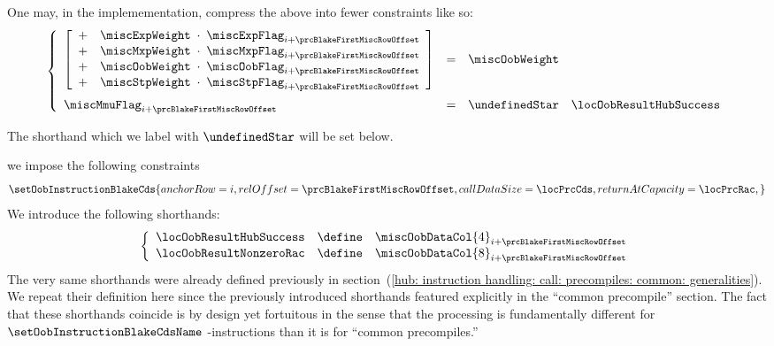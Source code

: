 \begin{description}
\begin{description}
				\saNote{} \label{hub: instruction handling: call: precompiles: blake: generalities: optimized misc flags}
				One may, in the implemementation, compress the above into fewer constraints like so:
				\[
					\left\{ \begin{array}{lcl}
						\left[ \begin{array}{clcl}
							+ & \miscExpWeight & \!\!\! \cdot \!\!\! & \miscExpFlag _{i + \prcBlakeFirstMiscRowOffset} \\
							+ & \miscMxpWeight & \!\!\! \cdot \!\!\! & \miscMxpFlag _{i + \prcBlakeFirstMiscRowOffset} \\
							+ & \miscOobWeight & \!\!\! \cdot \!\!\! & \miscOobFlag _{i + \prcBlakeFirstMiscRowOffset} \\
							+ & \miscStpWeight & \!\!\! \cdot \!\!\! & \miscStpFlag _{i + \prcBlakeFirstMiscRowOffset} \\
						\end{array} \right]
						& = & \miscOobWeight
						\vspace{2mm} \\
						\miscMmuFlag _{i + \prcBlakeFirstMiscRowOffset} & = & \undefinedStar \quad \locOobResultHubSuccess \\
					\end{array} \right.
				\]

				\saNote{}
				The shorthand \locOobResultHubSuccess{} which we label with $\undefinedStar$ will be set below.
			\item[\underline{Setting the \oobMod{} instruction and shorthands:}] 
				we impose the following constraints
				\[
					\label{hub: instruction handling: call: precompiles: blake: hub success call}
					\setOobInstructionBlakeCds {
						anchorRow        = i                           ,
						relOffset        = \prcBlakeFirstMiscRowOffset ,
						callDataSize     = \locPrcCds                  ,
						returnAtCapacity = \locPrcRac                  ,
					}
				\]
				We introduce the following shorthands:
				\[
					\left\{ \begin{array}{lcl} \label{hub: instruction handling: call: precompiles: blake: shorthands}
						\locOobResultHubSuccess      & \define & \miscOobDataCol{4}_{i + \prcBlakeFirstMiscRowOffset} \\
						\locOobResultNonzeroRac      & \define & \miscOobDataCol{8}_{i + \prcBlakeFirstMiscRowOffset} \\
					\end{array} \right.
				\]
				\saNote{}
				The very same shorthands were already defined previously in section~(\ref{hub: instruction handling: call: precompiles: common: generalities}).
				We repeat their definition here since the previously introduced shorthands featured explicitly in the ``common precompile'' section.
				The fact that these shorthands coincide is by design yet fortuitous in the sense that the \oobMod{} processing is fundamentally different for
				$\setOobInstructionBlakeCdsName$ \oobMod{}-instructions than it is for ``common precompiles.''


\end{description}
\end{description}
